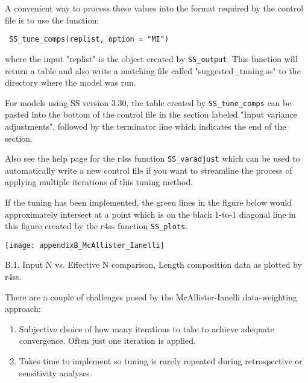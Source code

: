 A convenient way to process these values into the format required by the control file is to use the function:

\texttt{ SS\_tune\_comps(replist, option = "MI") }

where the input "replist" is the object created by \texttt{SS\_output}. This function will return a table and also write a matching file called "suggested\_tuning.ss" to the directory where the model was run.

For models using SS version 3.30, the table created by \texttt{SS\_tune\_comps} can be pasted into the bottom of the control file in the section labeled "Input variance adjustments", followed by the terminator line which indicates the end of the section. 



Also see the help page for the r4ss function \texttt{SS\_varadjust} which can be used to automatically write a new control file if you want to streamline the process of applying multiple iterations of this tuning method.

If the tuning has been implemented, the green lines in the figure below would approximately intersect at a point which is on the black 1-to-1 diagonal line in this figure created by the r4ss function \texttt{SS\_plots}.

\begin{center}
	\texttt{[image: appendixB\_McAllister\_Ianelli]}\\
\end{center}
\figurename{ B.1. Input N vs. Effective N comparison, Length composition data as plotted by r4ss.}

There are a couple of challenges posed by the McAllister-Ianelli data-weighting approach:
\begin{enumerate}
	\item Subjective choice of how many iterations to take to achieve adequate convergence. Often just one iteration is applied.
	
	\item Takes time to implement so tuning is rarely repeated during retrospective or sensitivity analyses.
\end{enumerate}

